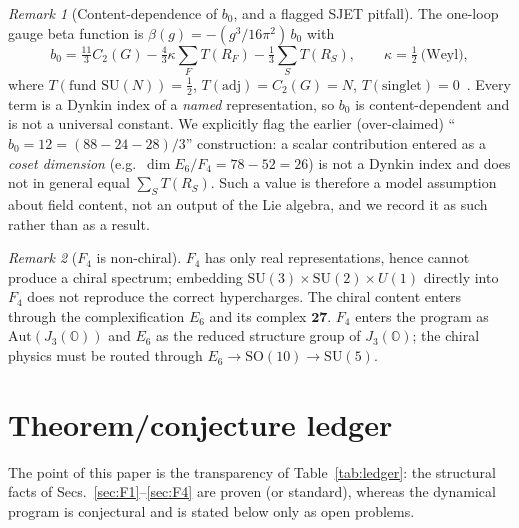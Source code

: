 \documentclass[aps,prresearch,onecolumn,amsmath,amssymb,nofootinbib]{revtex4-2}
\theoremstyle{plain}\newtheorem{theorem}{Theorem}[section]\newtheorem{proposition}[theorem]{Proposition}\newtheorem{lemma}[theorem]{Lemma}\newtheorem{corollary}[theorem]{Corollary}
\theoremstyle{definition}\newtheorem{definition}[theorem]{Definition}\newtheorem{conjecture}[theorem]{Conjecture}
\theoremstyle{remark}\newtheorem{remark}[theorem]{Remark}
\begin{document}
\begin{remark}[Content-dependence of $b_0$, and a flagged SJET pitfall]
\label{rem:b0}
The one-loop gauge beta function is $\beta(g)=-(g^3/16\pi^2)\,b_0$ with
\begin{equation}
b_0=\tfrac{11}{3}C_2(G)-\tfrac43\kappa\sum_F T(R_F)-\tfrac13\sum_S T(R_S),\qquad \kappa=\tfrac12\ \text{(Weyl)},
\end{equation}
where $T(\text{fund }\mathrm{SU}(N))=\tfrac12$, $T(\text{adj})=C_2(G)=N$, $T(\text{singlet})=0$~\cite{Jones1974,MachacekVaughn1983}. Every term is a Dynkin index of a \emph{named} representation, so $b_0$ is content-dependent and is not a universal constant. We explicitly flag the earlier (over-claimed) ``$b_0=12=(88-24-28)/3$'' construction: a scalar contribution entered as a \emph{coset dimension} (e.g.\ $\dim E_6/F_4=78-52=26$) is not a Dynkin index and does not in general equal $\sum_S T(R_S)$. Such a value is therefore a model assumption about field content, not an output of the Lie algebra, and we record it as such rather than as a result.
\end{remark}

\begin{remark}[$F_4$ is non-chiral]
\label{rem:f4chiral}
$F_4$ has only real representations, hence cannot produce a chiral spectrum; embedding $\mathrm{SU}(3)\times\mathrm{SU}(2)\times U(1)$ directly into $F_4$ does not reproduce the correct hypercharges. The chiral content enters through the complexification $E_6$ and its complex $\mathbf{27}$. $F_4$ enters the program as $\mathrm{Aut}(J_3(\mathbb{O}))$ and $E_6$ as the reduced structure group of $J_3(\mathbb{O})$; the chiral physics must be routed through $E_6\to\mathrm{SO}(10)\to\mathrm{SU}(5)$.
\end{remark}

\section{Theorem/conjecture ledger}
\label{sec:ledger}

The point of this paper is the transparency of Table~\ref{tab:ledger}: the structural facts of Secs.~\ref{sec:F1}--\ref{sec:F4} are proven (or standard), whereas the dynamical program is conjectural and is stated below only as open problems.
\end{document}
